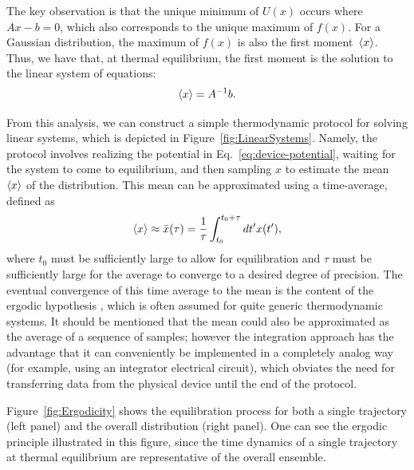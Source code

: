 \documentclass[prx,onecolumn,floatfix,longbibliography,notitlepage, nofootinbib]{revtex4-1}
\begin{document}
The key observation is that the unique minimum of $U(x)$ occurs where $Ax-b = 0$, which also corresponds to the unique maximum of $f(x)$. For a Gaussian distribution, the maximum of $f(x)$ is also the first moment~$\braket{x}$. Thus, we have that, at thermal equilibrium, the first moment is the solution to the linear system of equations:
\begin{equation}
    \label{eq:firstmoment}
    \braket{x} = A^{-1}b.
\end{equation}

From this analysis, we can construct a simple thermodynamic protocol for solving linear systems, which is depicted in Figure~\ref{fig:LinearSystems}. Namely, the protocol involves realizing the potential in Eq.~\eqref{eq:device-potential}, waiting for the system to come to equilibrium, and then sampling $x$ to estimate the mean $\braket{x}$ of the distribution. This mean can be approximated using a time-average, defined as
\begin{equation}
\label{eq:x-bar-def}
    \braket{x}\approx \bar{x}(\tau) = \frac{1}{\tau} \int_{t_0}^{t_0+\tau} dt' x(t'),
\end{equation}
where $t_0$ must be sufficiently large to allow for equilibration and $\tau$ must be sufficiently large for the average to converge to a desired degree of precision. The eventual convergence of this time average to the mean is the content of the ergodic hypothesis \cite{gallavotti1995ergodicity, sinai1963foundations}, which is often assumed for quite generic thermodynamic systems. It should be mentioned that the mean could also be approximated as the average of a sequence of samples; however the integration approach has the advantage that it can conveniently be implemented in a completely analog way (for example, using an integrator electrical circuit), which obviates the need for transferring data from the physical device until the end of the protocol. 

Figure~\ref{fig:Ergodicity} shows the equilibration process for both a single trajectory (left panel) and the overall distribution (right panel). One can see the ergodic principle illustrated in this figure, since the time dynamics of a single trajectory at thermal equilibrium are representative of the overall ensemble.
\end{document}
